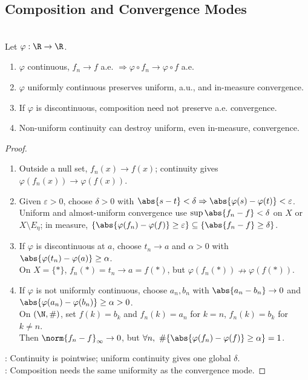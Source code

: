 \subsection{Composition and Convergence Modes}

\begin{proposition} \label{prop:composition-preserves-pointwise-and-almost-uniform-modes} \\
Let $\varphi:\R\to\R$.
\begin{enumerate}[label=(\roman*)]
\setlength{\itemsep}{0pt}
\item $\varphi$ continuous, $f_n\to f$ a.e. $\Rightarrow \varphi\circ f_n\to\varphi\circ f$ a.e.
\item $\varphi$ uniformly continuous preserves uniform, a.u., and in-measure convergence.
\item If $\varphi$ is discontinuous, composition need not preserve a.e. convergence.
\item Non-uniform continuity can destroy uniform, even in-measure, convergence.
\end{enumerate}
\begin{proof}
\begin{enumerate}[label=(\roman*)]
\setlength{\itemsep}{0pt}
\item Outside a null set, $f_n(x)\to f(x)$; continuity gives $\varphi(f_n(x))\to\varphi(f(x))$.
\item Given $\varepsilon>0$, choose $\delta>0$ with $\abs{s-t}<\delta\Rightarrow\abs{\varphi(s)-\varphi(t)}<\varepsilon$. Uniform and almost-uniform convergence use $\sup\abs{f_n-f}<\delta$ on $X$ or $X\setminus E_\eta$; in measure, $\{\abs{\varphi(f_n)-\varphi(f)}\geq\varepsilon\}\subseteq\{\abs{f_n-f}\geq\delta\}$.
\item If $\varphi$ is discontinuous at $a$, choose $t_n\to a$ and $\alpha>0$ with $\abs{\varphi(t_n)-\varphi(a)}\geq\alpha$.\\
On $X=\{\ast\}$, $f_n(\ast)=t_n\to a=f(\ast)$, but $\varphi(f_n(\ast))\nrightarrow\varphi(f(\ast))$.
\item If $\varphi$ is not uniformly continuous, choose $a_n,b_n$ with $\abs{a_n-b_n}\to0$ and $\abs{\varphi(a_n)-\varphi(b_n)}\geq\alpha>0$.\\
On $(\N,\#)$, set $f(k)=b_k$ and $f_n(k)=a_n$ for $k=n$, $f_n(k)=b_k$ for $k\neq n$.\\
Then $\norm{f_n-f}_\infty\to0$, but $\forall n,\ \#\{\abs{\varphi(f_n)-\varphi(f)}\geq\alpha\}=1$.
\end{enumerate}
: Continuity is pointwise; uniform continuity gives one global $\delta$.\\
: Composition needs the same uniformity as the convergence mode.
\end{proof}
\end{proposition}

